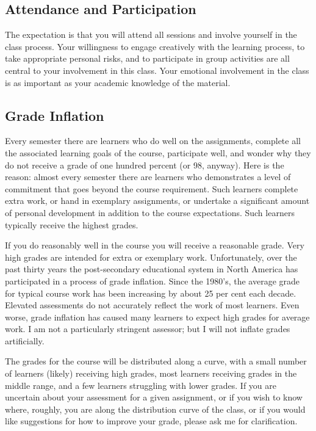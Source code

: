 \documentclass[10pt,DIV09,letterpaper,oneside,headsepline]{scrreprt}
\begin{document}
\subsection{Attendance and Participation}
The expectation is that you will attend all sessions and involve
yourself in the class process. Your willingness to engage creatively
with the learning process, to take appropriate personal risks, and to
participate in group activities are all central to your involvement in
this class. Your emotional involvement in the class is
as important as your academic knowledge of the material.

\subsection{Grade Inflation}
Every semester there are learners who do well on the
assignments, complete all the associated learning goals of the course,
participate well, and wonder why they do not receive a grade of one
hundred percent (or 98, anyway). Here is the reason: almost every
semester there are learners who demonstrates a level of commitment
that goes beyond the course requirement. Such learners complete extra
work, or hand in exemplary assignments, or undertake a significant
amount of personal development in addition to the course expectations.
Such learners typically receive the highest grades.

If you do reasonably well in the course you will receive a reasonable
grade. Very high grades are intended for extra or exemplary work.
Unfortunately, over the past thirty years the post-secondary
educational system in North America has participated in a process of
grade inflation. Since the 1980's, the average grade for typical
course work has been increasing by about 25 per cent each decade.
Elevated assessments do not accurately reflect the work of most
learners. Even worse, grade inflation has caused many learners to
expect high grades for average work. I am not a particularly stringent
assessor; but I will not inflate grades artificially.

The grades for the course will be distributed along a curve, with a
small number of learners (likely) receiving high grades, most learners
receiving grades in the middle range, and a few learners struggling
with lower grades. If you are uncertain about your assessment for a
given assignment, or if you wish to know where, roughly, you are along
the distribution curve of the class, or if you would like suggestions
for how to improve your grade, please ask me for clarification.
\end{document}
